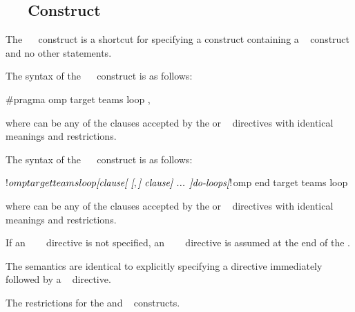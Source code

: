 \subsection{~~ Construct}
\label{subsec:target teams loop}
\summary
The ~~ construct is a shortcut for specifying a 
 construct containing a ~ construct and no other 
statements.

\syntax
\begin{ccppspecific}
The syntax of the ~~ construct is as follows:

\begin{ompcPragma}
#pragma omp target teams loop \plc{[clause[ [},\plc{] clause] ... ] new-line}
\end{ompcPragma}

where  can be any of the clauses accepted by the  or
~ directives with identical meanings and restrictions.
\end{ccppspecific}

\begin{fortranspecific}
The syntax of the ~~ construct is as follows:

\begin{ompfPragma}
!$omp target teams loop \plc{[clause[ [},\plc{] clause] ... ]}
    \plc{do-loops}
\plc{[}!$omp end target teams loop\plc{]}
\end{ompfPragma}

where  can be any of the clauses accepted by the  or
~ directives with identical meanings and restrictions.

If an ~~~ directive is not 
specified, an ~~~ directive 
is assumed at the end of the .
\end{fortranspecific}

\descr
The semantics are identical to explicitly specifying a 
directive immediately followed by a ~ directive.

\restrictions
The restrictions for the  and ~ constructs.

